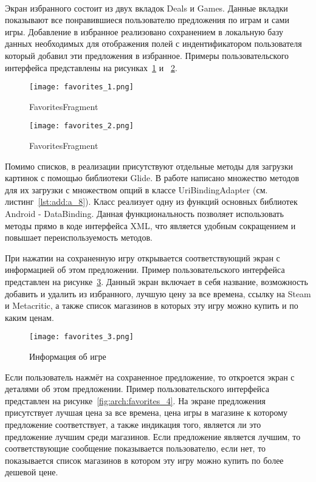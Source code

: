 ~\par
Экран избранного состоит из двух вкладок Deals и Games. Данные вкладки показывают все понравившиеся пользователю предложения по играм и сами игры. Добавление в избранное реализовано сохранением в локальную базу данных необходимых для отображения полей с индентификатором пользователя который добавил эти предложения в избранное. Примеры пользовательского интерфейса представлены на рисунках~\ref{fig:arch:favorites_1} и ~\ref{fig:arch:favorites_2}.

\begin{figure}[H]
 \centering
   \texttt{[image: favorites\_1.png]} 
   \caption{FavoritesFragment}
   \label{fig:arch:favorites_1}
\end{figure}

\begin{figure}[H]
 \centering
   \texttt{[image: favorites\_2.png]} 
   \caption{FavoritesFragment}
   \label{fig:arch:favorites_2}
\end{figure}

Помимо списков, в реализации присутствуют отдельные методы для загрузки картинок с помощью библиотеки Glide. В работе написано множество методов для их загрузки с множеством опций в классе UriBindingAdapter (см. листинг~\ref{lst:add:a_8}). Класс реализует одну из функций основных библиотек Android - DataBinding. Данная функциональность позволяет использовать методы прямо в коде интерфейса XML, что является удобным сокращением и повышает переиспользуемость методов.

При нажатии на сохраненную игру открывается соответствующий экран с информацией об этом предложении. Пример пользовательского интерфейса представлен на рисунке~\ref{fig:arch:favorites_3}. Данный экран включает в себя название, возможность добавить и удалить из избранного, лучшую цену за все времена, ссылку на Steam и Metacritic, а также список магазинов в которых эту игру можно купить и по каким ценам.

\begin{figure}[H]
 \centering
   \texttt{[image: favorites\_3.png]} 
   \caption{Информация об игре}
   \label{fig:arch:favorites_3}
\end{figure}

Если пользователь нажмёт на сохраненное предложение, то откроется экран с деталями об этом предложении. Пример пользовательского интерфейса представлен на рисунке~\ref{fig:arch:favorites_4}. На экране предложения присутствует лучшая цена за все времена, цена игры в магазине к которому предложение соответствует, а также индикация того, является ли это предложение лучшим среди магазинов. Если предложение является лучшим, то соответствующие сообщение показывается пользователю, если нет, то показывается список магазинов в котором эту игру можно купить по более дешевой цене.

